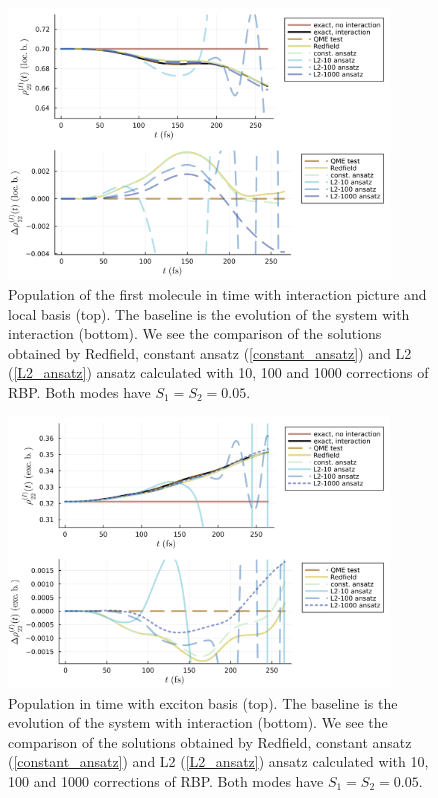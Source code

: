 \newpage
\begin{figure}[H]
\centering
\includegraphics[width=0.9\textwidth]{img/ansatz/ansatz02_joined_intloc22.png}
\caption{Population of the first molecule in time with interaction picture and local basis (top). The baseline is the evolution of the system with interaction (bottom). We see the comparison of the solutions obtained by Redfield, constant ansatz (\ref{constant_ansatz}) and L2 (\ref{L2_ansatz}) ansatz calculated with 10, 100 and 1000 corrections of RBP. Both modes have $S_1=S_2=0.05$.  }
\label{img:ansatz02_joined_intloc22}
\end{figure}

\begin{figure}[H]
\centering
\includegraphics[width=0.9\textwidth]{img/ansatz/ansatz02_joined_schexc22.png}
\caption{Population in time with exciton basis (top). The baseline is the evolution of the system with interaction (bottom). We see the comparison of the solutions obtained by Redfield, constant ansatz (\ref{constant_ansatz}) and L2 (\ref{L2_ansatz}) ansatz calculated with 10, 100 and 1000 corrections of RBP. Both modes have $S_1=S_2=0.05$. }
\label{img:ansatz02_joined_schexc22}
\end{figure}


